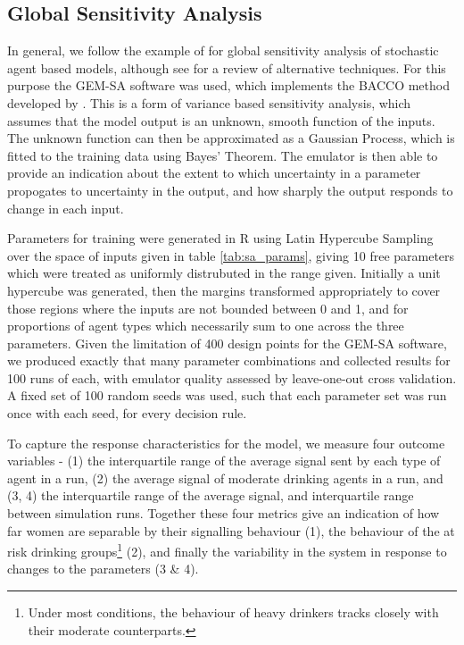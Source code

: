 \subsection{Global Sensitivity Analysis}
\label{sub:sensitivity}
In general, we follow the example of \cite{Bijak2013b} for global sensitivity analysis of stochastic agent based models, although see \citet{Thiele2014} for a review of alternative techniques. For this purpose the \ac{GEM-SA} software \citep{Kennedy} was used, which implements the \ac{BACCO} method developed by \citeauthor{Oakley2004} \citep{Oakley2002,Oakley2004,Dorresteijn2010}. This is a form of variance based sensitivity analysis, which assumes that the model output is an unknown, smooth function of the inputs. The unknown function can then be approximated as a Gaussian Process, which is fitted to the training data using Bayes' Theorem. The emulator is then able to provide an indication about the extent to which uncertainty in a parameter propogates to uncertainty in the output, and how sharply the output responds to change in each input.

\begin{comment}

Justification for doing SA, point out the wide variety of places this gets used. Talk about uncertainty, briefly raise model discrepancy.

\end{comment}

Parameters for training were generated in R \citep{RTeam2014} using Latin Hypercube Sampling \citep{Carnell2012} over the space of inputs given in table \ref{tab:sa_params}, giving 10 free parameters which were treated as uniformly distrubuted in the range given. Initially a unit hypercube was generated, then the margins transformed appropriately to cover those regions where the inputs are not bounded between 0 and 1, and for proportions of agent types which necessarily sum to one across the three parameters. Given the limitation of 400 design points for the \ac{GEM-SA} software, we produced exactly that many parameter combinations and collected results for 100 runs of each, with emulator quality assessed by leave-one-out cross validation. A fixed set of 100 random seeds was used, such that each parameter set was run once with each seed, for every decision rule.

To capture the response characteristics for the model, we measure four outcome variables - (1) the interquartile range of the average signal sent by each type of agent in a run, (2) the average signal of moderate drinking agents in a run, and (3, 4) the interquartile range of the average signal, and interquartile range between simulation runs. Together these four metrics give an indication of how far women are separable by their signalling behaviour (1), the behaviour of the at risk drinking groups\footnote{Under most conditions, the behaviour of heavy drinkers tracks closely with their moderate counterparts.} (2), and finally the variability in the system in response to changes to the parameters (3 \& 4).

